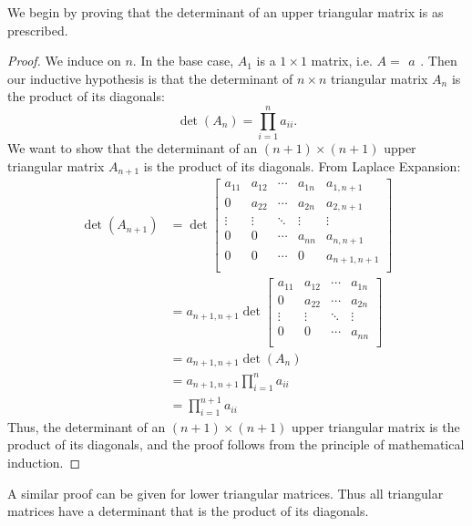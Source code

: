 We begin by proving that the determinant of an upper triangular matrix is as prescribed.

\begin{proof}
    We induce on $n.$ In the base case, $A_1$ is a $1\times 1$ matrix, i.e. $A=\begin{matrix}a\end{matrix}.$ Then our inductive hypothesis is that the determinant of $n\times n$ triangular matrix $A_n$ is the product of its diagonals: $$\det(A_n) = \prod\limits_{i=1}^{n} a_{ii}.$$ We want to show that the determinant of an $(n+1)\times(n+1)$ upper triangular matrix $A_{n+1}$ is the product of its diagonals. From Laplace Expansion:
    \begin{align*}
        \det(A_{n+1}) &= \det\begin{bmatrix}
        a_{11} & a_{12} & \cdots & a_{1n} & a_{1,n+1} \\
        0 & a_{22} & \cdots & a_{2n} & a_{2,n+1} \\
        \vdots & \vdots & \ddots & \vdots & \vdots \\
        0 & 0 & \cdots & a_{nn} & a_{n,n+1} \\
        0 & 0 & \cdots & 0 & a_{n+1,n+1} \\
        \end{bmatrix} \\
        &= a_{n+1,n+1}\det\begin{bmatrix}
        a_{11} & a_{12} & \cdots & a_{1n} \\
        0 & a_{22} & \cdots & a_{2n} \\
        \vdots & \vdots & \ddots & \vdots \\
        0 & 0 & \cdots & a_{nn} \\
        \end{bmatrix} \\
        &= a_{n+1,n+1}\det(A_n) \\
        &= a_{n+1,n+1}\prod\limits_{i=1}^{n} a_{ii} \\
        &= \prod\limits_{i=1}^{n+1} a_{ii}
    \end{align*}
    Thus, the determinant of an $(n+1)\times(n+1)$ upper triangular matrix is the product of its diagonals, and the proof follows from the principle of mathematical induction.
\end{proof}

A similar proof can be given for lower triangular matrices. Thus all triangular matrices have a determinant that is the product of its diagonals.